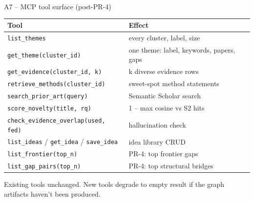 \documentclass[10pt,aspectratio=169]{beamer}
\begin{document}
\begin{frame}{A7 -- MCP tool surface (post-PR-4)}
  \scriptsize
  \begin{tabular}{@{}l l@{}}
    \toprule
    Tool & Effect \\
    \midrule
    \texttt{list\_themes}            & every cluster, label, size \\
    \texttt{get\_theme(cluster\_id)} & one theme: label, keywords, papers, gaps \\
    \texttt{get\_evidence(cluster\_id, k)} & k diverse evidence rows \\
    \texttt{retrieve\_methods(cluster\_id)} & sweet-spot method statements \\
    \texttt{search\_prior\_art(query)} & Semantic Scholar search \\
    \texttt{score\_novelty(title, rq)} & 1 -- max cosine vs S2 hits \\
    \texttt{check\_evidence\_overlap(used, fed)} & hallucination check \\
    \texttt{list\_ideas} / \texttt{get\_idea} / \texttt{save\_idea} & idea library CRUD \\
    \alert{\texttt{list\_frontier(top\_n)}}   & \alert{PR-4: top frontier gaps} \\
    \alert{\texttt{list\_gap\_pairs(top\_n)}} & \alert{PR-4: top structural bridges} \\
    \bottomrule
  \end{tabular}

  \vspace{0.6em}
  \footnotesize Existing tools unchanged. New tools degrade to empty result
  if the graph artifacts haven't been produced.
\end{frame}
\end{document}
